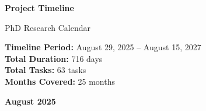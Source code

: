 \documentclass[landscape,a4paper]{article}
\begin{document}
\begin{titlepage}
\centering
\vspace*{1cm}

{\LARGE\textbf{Project Timeline}}

\vspace{0.5cm}
{\large PhD Research Calendar}

\vspace{1cm}

\begin{minipage}{0.9\textwidth}
\centering
\textbf{Timeline Period:} August 29, 2025 -- August 15, 2027\\
\textbf{Total Duration:} 716 days\\
\textbf{Total Tasks:} 63 tasks\\
\textbf{Months Covered:} 25 months
\end{minipage}

\vfill

\end{titlepage}

\newpage
\pagestyle{empty}

\begin{center}
{\large\textbf{August 2025}}
\end{center}

\vspace{0.5cm}
\end{document}
